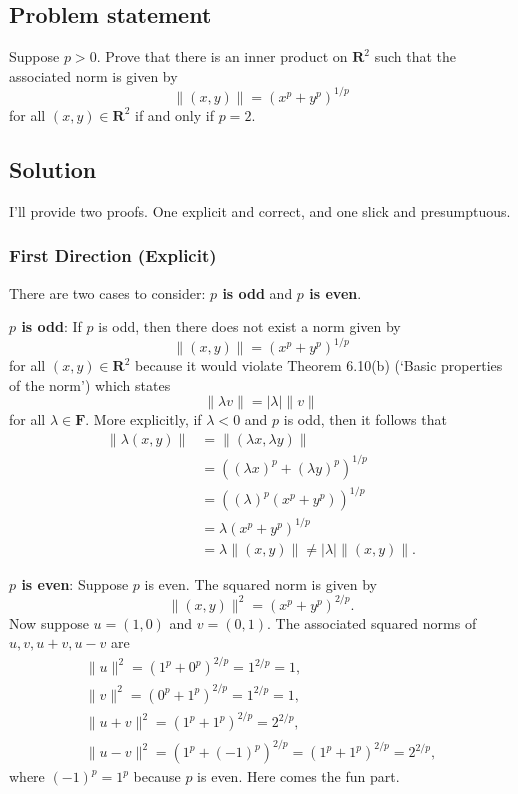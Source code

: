 \documentclass{article}
\providecommand{\abs}[1]{\lvert#1\rvert} \providecommand{\norm}[1]{\lVert#1\rVert}
\begin{document}
\subsection*{Problem statement}
Suppose $p>0$. 
Prove that there is an inner product on $\mathbf{R}^2$ such that the associated norm is given by
\[\norm{(x,y)}=(x^p+y^p)^{1/p}\]
for all $(x,y)\in \mathbf{R}^2$ if and only if $p=2$.

\subsection*{Solution}
I'll provide two proofs. 
One explicit and correct, and one slick and presumptuous.
\subsubsection*{First Direction (Explicit)}
There are two cases to consider: \textbf{$p$ is odd} and \textbf{$p$ is even}.

\textbf{$p$ is odd}: 
If $p$ is odd, then there does not exist a norm given by
\[\norm{(x,y)}=(x^p+y^p)^{1/p}\]
for all $(x,y)\in \mathbf{R}^2$ because it would violate Theorem 6.10(b) (`Basic properties of the norm') which states
\[\norm{\lambda v}=\abs{\lambda}\norm{v}\]
for all $\lambda\in\mathbf{F}$. 
More explicitly, if $\lambda<0$ and $p$ is odd, then it follows that
\begin{align*}
    \norm{\lambda(x,y)}&=\norm{(\lambda x,\lambda y)}\\
    &=((\lambda x)^p+(\lambda y)^p)^{1/p}\\
    &=((\lambda)^p(x^p+ y^p))^{1/p}\\
    &=\lambda(x^p+y^p)^{1/p}\\
    &=\lambda\norm{(x,y)}\neq\abs{\lambda}\norm{(x,y)}.
\end{align*}

\textbf{$p$ is even}: 
Suppose $p$ is even. 
The squared norm is given by
\[\norm{(x,y)}^2=(x^p+y^p)^{2/p}.\]
Now suppose $u=(1,0)$ and $v=(0,1)$. 
The associated squared norms of $u,v,u+v,u-v$ are
\begin{gather*}
    \norm{u}^2=(1^p+0^p)^{2/p}=1^{2/p}=1,\\
    \norm{v}^2=(0^p+1^p)^{2/p}=1^{2/p}=1,\\
    \norm{u+v}^2=(1^p+1^p)^{2/p}=2^{2/p},\\
    \norm{u-v}^2=(1^p+(-1)^p)^{2/p}=(1^p+1^p)^{2/p}=2^{2/p},
\end{gather*}
where $(-1)^p=1^p$ because $p$ is even. 
Here comes the fun part. 
\end{document}
